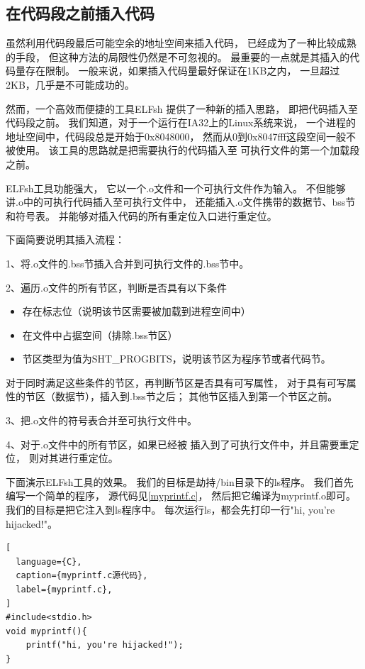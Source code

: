 \subsection{在代码段之前插入代码}

虽然利用代码段最后可能空余的地址空间来插入代码，
已经成为了一种比较成熟的手段，
但这种方法的局限性仍然是不可忽视的。
最重要的一点就是其插入的代码量存在限制。
一般来说，如果插入代码量最好保证在1KB之内，
一旦超过2KB，几乎是不可能成功的。

然而，一个高效而便捷的工具ELFsh
提供了一种新的插入思路，
即把代码插入至代码段之前。
我们知道，对于一个运行在IA32上的Linux系统来说，
一个进程的地址空间中，代码段总是开始于0x8048000，
然而从0到0x8047fff这段空间一般不被使用。
该工具的思路就是把需要执行的代码插入至
可执行文件的第一个加载段之前。

ELFsh工具功能强大，
它以一个.o文件和一个可执行文件作为输入。
不但能够讲.o中的可执行代码插入至可执行文件中，
还能插入.o文件携带的数据节、bss节和符号表。
并能够对插入代码的所有重定位入口进行重定位。

下面简要说明其插入流程：

1、将.o文件的.bss节插入合并到可执行文件的.bss节中。

2、遍历.o文件的所有节区，判断是否具有以下条件
\begin{itemize}
  \item 存在标志位（说明该节区需要被加载到进程空间中）
  \item 在文件中占据空间（排除.bss节区）
  \item 节区类型为值为SHT\_PROGBITS，说明该节区为程序节或者代码节。
\end{itemize}
  
对于同时满足这些条件的节区，再判断节区是否具有可写属性，
对于具有可写属性的节区（数据节），插入到.bss节之后；
其他节区插入到第一个节区之前。

3、把.o文件的符号表合并至可执行文件中。

4、对于.o文件中的所有节区，如果已经被
插入到了可执行文件中，并且需要重定位，
则对其进行重定位。

下面演示ELFsh工具的效果。
我们的目标是劫持/bin目录下的ls程序。
我们首先编写一个简单的程序，
源代码见\ref{myprintf.c}，
然后把它编译为myprintf.o即可。
我们的目标是把它注入到ls程序中。
每次运行ls，都会先打印一行"hi, you're hijacked!"。

\begin{lstlisting}[
  language={C},
  caption={myprintf.c源代码},
  label={myprintf.c},
]
#include<stdio.h>
void myprintf(){
    printf("hi, you're hijacked!");
}
\end{lstlisting}

